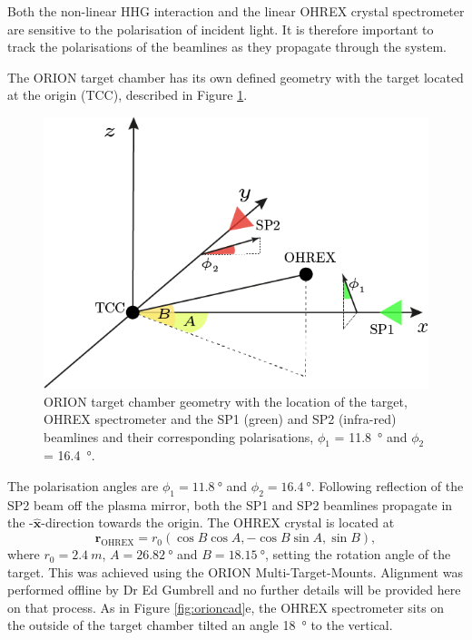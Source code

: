 Both the non-linear HHG interaction and the linear OHREX crystal spectrometer are sensitive to the polarisation of incident light. It is therefore important to track the polarisations of the beamlines as they propagate through the system.

The ORION target chamber has its own defined geometry with the target located at the origin (\ac{TCC}), described in Figure \ref{fig:miscoriontargetchambergeometry}.
\begin{figure}
	\centering
	\includegraphics[width=0.7\linewidth]{figures/misc/misc_ORION_target_chamber_geometry}
	\caption[ORION target chamber geometry]{ORION target chamber geometry with the location of the target, OHREX spectrometer and the SP1 (green) and SP2 (infra-red) beamlines and their corresponding polarisations, $\phi_1$ = \qty{11.8}{\degree} and $\phi_2$ = \qty{16.4}{\degree}.}
	\label{fig:miscoriontargetchambergeometry}
\end{figure}
The polarisation angles are $\phi_1 = \qty{11.8}{\degree}$ and $\phi_2 = \qty{16.4}{\degree}$. Following reflection of the SP2 beam off the plasma mirror, both the SP1 and SP2 beamlines propagate in the -$\hat{\mathbf{x}}$-direction  towards the origin. The OHREX crystal is located at 
\begin{equation}
	\mathbf{r}_\mathrm{OHREX} = r_0(\cos B\cos A,-\cos B\sin A, \sin B),
\end{equation}
where $r_0 = \qty{2.4}{m}$, $A = \qty{26.82} {\degree} $ and $B = \qty{18.15}{\degree}$, setting the rotation angle of the target. This was achieved using the ORION Multi-Target-Mounts. Alignment was performed offline by Dr Ed Gumbrell and no further details will be provided here on that process. As in Figure \ref{fig:orioncad}e, the OHREX spectrometer sits on the outside of the target chamber tilted an angle \qty{18}{\degree} to the vertical.

